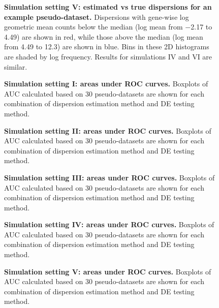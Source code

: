 \documentclass[10pt]{article}
\begin{document}
\begin{figure}[!ht] %
   \centering
 \caption{{\bf Simulation setting V: estimated vs true dispersions for an example pseudo-dataset.} Dispersions with gene-wise log geometric mean counts below the median (log mean from $-$2.17 to 4.49) are shown in red, while those above the median (log mean from 4.49 to 12.3) are shown in blue. Bins in these 2D histograms are shaded by log frequency. Results for simulations IV and VI are similar.}
   \label{fig:pp5}
\end{figure}


\begin{figure}[!ht] %
   \centering
   \caption{{\bf Simulation setting I: areas under ROC curves.} Boxplots of AUC calculated based on 30 pseudo-datasets are shown for each combination of dispersion estimation method and DE testing method.}
   \label{fig:auc1}
\end{figure}

\begin{figure}[!ht] %
   \centering
   \caption{{\bf Simulation setting II: areas under ROC curves.} Boxplots of AUC calculated based on 30 pseudo-datasets are shown for each combination of dispersion estimation method and DE testing method.}
   \label{fig:auc2}
\end{figure}

\begin{figure}[!ht] %
   \centering
   \caption{{\bf Simulation setting III: areas under ROC curves.} Boxplots of AUC calculated based on 30 pseudo-datasets are shown for each combination of dispersion estimation method and DE testing method.}
   \label{fig:auc3}
\end{figure}

\begin{figure}[!ht] %
   \centering
   \caption{{\bf Simulation setting IV: areas under ROC curves.} Boxplots of AUC calculated based on 30 pseudo-datasets are shown for each combination of dispersion estimation method and DE testing method.}
   \label{fig:auc4}
\end{figure}

\begin{figure}[!ht] %
   \centering
   \caption{{\bf Simulation setting V: areas under ROC curves.} Boxplots of AUC calculated based on 30 pseudo-datasets are shown for each combination of dispersion estimation method and DE testing method.}
   \label{fig:auc5}
\end{figure}
\end{document}
